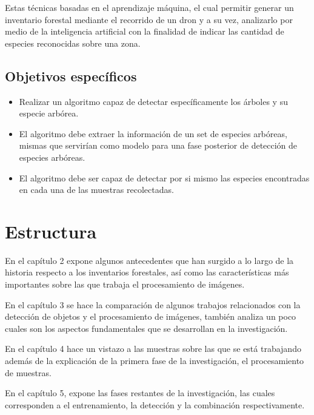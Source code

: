 Estas técnicas  basadas en el aprendizaje máquina, el cual permitir
generar un inventario forestal mediante el recorrido de un dron y a su vez, analizarlo por medio de la inteligencia artificial con la finalidad de indicar las cantidad de especies reconocidas sobre una zona.

\subsection{Objetivos específicos}
\begin{itemize}
\item Realizar un algoritmo capaz de detectar específicamente los árboles y su especie arbórea.
\end{itemize}

\begin{itemize}
\item El algoritmo debe extraer la información de un set de especies arbóreas, mismas que servirían como modelo para una fase posterior de detección de especies arbóreas.
\end{itemize}

\begin{itemize}
\item El algoritmo debe ser capaz de detectar por si mismo las especies encontradas en cada una de las muestras recolectadas.
\end{itemize}

\pagebreak

\section{Estructura}
En el capítulo 2 expone algunos antecedentes que han surgido a lo largo
de la historia respecto a los inventarios forestales, así como las características más importantes sobre las que trabaja el procesamiento de imágenes.

En el capítulo 3 se hace la comparación de algunos trabajos relacionados con la detección de objetos y el procesamiento de imágenes, también analiza un poco cuales son los aspectos fundamentales que se desarrollan en la investigación.

En el capítulo 4 hace un vistazo a las muestras sobre las que se está trabajando además de la explicación de la primera fase de la investigación, el procesamiento de muestras.

En el capítulo 5, expone las fases restantes de la investigación, las cuales corresponden a el entrenamiento, la detección y la combinación respectivamente.

